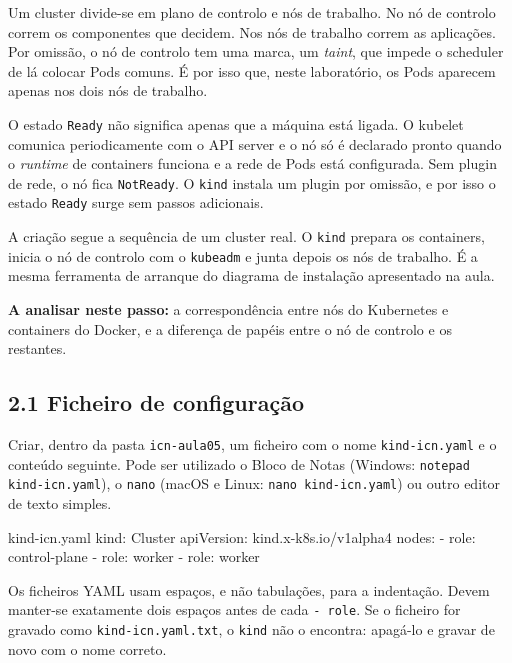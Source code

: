 \documentclass[11pt,a4paper]{article}
\newcommand{\cmd}[1]{\texttt{#1}}
\begin{document}
\begin{teoria}
Um cluster divide-se em plano de controlo e nós de trabalho. No nó de controlo correm os componentes que decidem. Nos nós de trabalho correm as aplicações. Por omissão, o nó de controlo tem uma marca, um \emph{taint}, que impede o scheduler de lá colocar Pods comuns. É por isso que, neste laboratório, os Pods aparecem apenas nos dois nós de trabalho.

O estado \cmd{Ready} não significa apenas que a máquina está ligada. O kubelet comunica periodicamente com o API server e o nó só é declarado pronto quando o \emph{runtime} de containers funciona e a rede de Pods está configurada. Sem plugin de rede, o nó fica \cmd{NotReady}. O \cmd{kind} instala um plugin por omissão, e por isso o estado \cmd{Ready} surge sem passos adicionais.

A criação segue a sequência de um cluster real. O \cmd{kind} prepara os containers, inicia o nó de controlo com o \cmd{kubeadm} e junta depois os nós de trabalho. É a mesma ferramenta de arranque do diagrama de instalação apresentado na aula.

\textbf{A analisar neste passo:} a correspondência entre nós do Kubernetes e containers do Docker, e a diferença de papéis entre o nó de controlo e os restantes.
\end{teoria}

\subsection*{2.1 Ficheiro de configuração}

Criar, dentro da pasta \cmd{icn-aula05}, um ficheiro com o nome \cmd{kind-icn.yaml} e o conteúdo seguinte. Pode ser utilizado o Bloco de Notas (Windows: \cmd{notepad kind-icn.yaml}), o \cmd{nano} (macOS e Linux: \cmd{nano kind-icn.yaml}) ou outro editor de texto simples.

\begin{ficheiro}{kind-icn.yaml}
kind: Cluster
apiVersion: kind.x-k8s.io/v1alpha4
nodes:
  - role: control-plane
  - role: worker
  - role: worker
\end{ficheiro}

\begin{erro}
Os ficheiros YAML usam espaços, e não tabulações, para a indentação. Devem manter-se exatamente dois espaços antes de cada \cmd{- role}. Se o ficheiro for gravado como \cmd{kind-icn.yaml.txt}, o \cmd{kind} não o encontra: apagá-lo e gravar de novo com o nome correto.
\end{erro}
\end{document}
